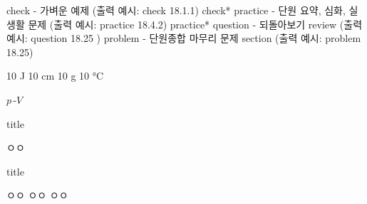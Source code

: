 





check - 가벼운 예제 (출력 예시: check 18.1.1)
check* 
practice - 단원 요약, 심화, 실생활 문제 (출력 예시: practice 18.4.2)
practice*
question - 되돌아보기 review (출력 예시: question 18.25 )
problem - 단원종합 마무리 문제 section (출력 예시: problem 18.25)





10 J 		
10 cm		
10 g		
10 °C       

$p\,$-$V$







\begin{solbox}{title}
\bnset
{}
\bn \zzz


 ㅇㅇ \zzz
\end{solbox}





\begin{solbox}{title}
\bnset
{}
\bn \zzz

\bnset
{}
\bn \zzz

\bnset
{}
\bn \zzz

 ㅇㅇ \zzz
{} ㅇㅇ \zzz
{} ㅇㅇ
\end{solbox}







